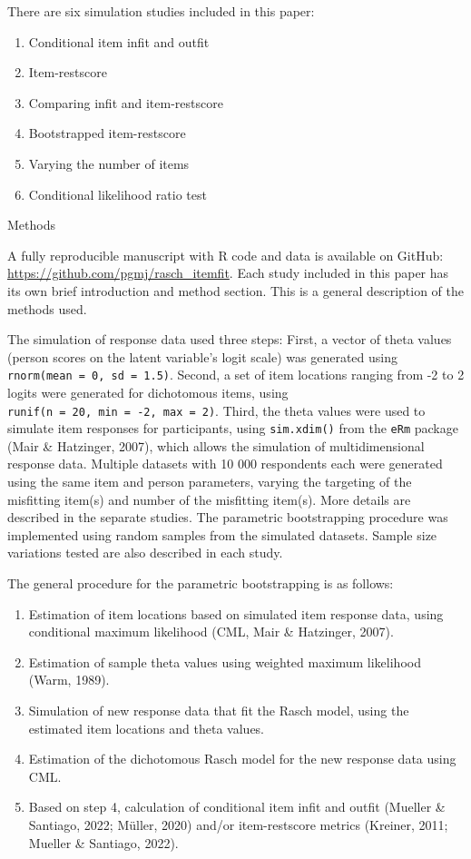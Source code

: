 \documentclass[
  letterpaper,
  DIV=11,
  numbers=noendperiod]{scrartcl}
\providecommand{\tightlist}{%
  \setlength{\itemsep}{0pt}\setlength{\parskip}{0pt}}\usepackage{longtable,booktabs,array}
\begin{document}
There are six simulation studies included in this paper:

\begin{enumerate}
\def\labelenumi{\arabic{enumi}.}
\tightlist
\item
  Conditional item infit and outfit
\item
  Item-restscore
\item
  Comparing infit and item-restscore
\item
  Bootstrapped item-restscore
\item
  Varying the number of items
\item
  Conditional likelihood ratio test
\end{enumerate}

Methods

A fully reproducible manuscript with R code and data is available on
GitHub: \url{https://github.com/pgmj/rasch_itemfit}. Each study included
in this paper has its own brief introduction and method section. This is
a general description of the methods used.

The simulation of response data used three steps: First, a vector of
theta values (person scores on the latent variable's logit scale) was
generated using \texttt{rnorm(mean\ =\ 0,\ sd\ =\ 1.5)}. Second, a set
of item locations ranging from -2 to 2 logits were generated for
dichotomous items, using
\texttt{runif(n\ =\ 20,\ min\ =\ -2,\ max\ =\ 2)}. Third, the theta
values were used to simulate item responses for participants, using
\texttt{sim.xdim()} from the \texttt{eRm} package (Mair \& Hatzinger,
2007), which allows the simulation of multidimensional response data.
Multiple datasets with 10 000 respondents each were generated using the
same item and person parameters, varying the targeting of the misfitting
item(s) and number of the misfitting item(s). More details are described
in the separate studies. The parametric bootstrapping procedure was
implemented using random samples from the simulated datasets. Sample
size variations tested are also described in each study.

The general procedure for the parametric bootstrapping is as follows:

\begin{enumerate}
\def\labelenumi{\arabic{enumi}.}
\tightlist
\item
  Estimation of item locations based on simulated item response data,
  using conditional maximum likelihood (CML, Mair \& Hatzinger, 2007).
\item
  Estimation of sample theta values using weighted maximum likelihood
  (Warm, 1989).
\item
  Simulation of new response data that fit the Rasch model, using the
  estimated item locations and theta values.
\item
  Estimation of the dichotomous Rasch model for the new response data
  using CML.
\item
  Based on step 4, calculation of conditional item infit and outfit
  (Mueller \& Santiago, 2022; Müller, 2020) and/or item-restscore
  metrics (Kreiner, 2011; Mueller \& Santiago, 2022).
\end{enumerate}
\end{document}
